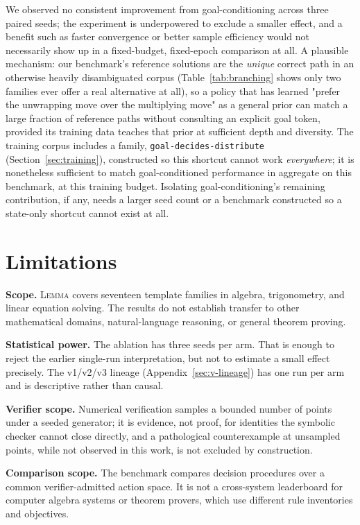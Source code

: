 \documentclass[11pt]{article}
\numberwithin{equation}{section}
\newcommand{\lemma}{\textsc{Lemma}}
\begin{document}
We observed no consistent improvement from goal-conditioning across three paired seeds; the experiment is underpowered to exclude a smaller effect, and a benefit such as faster convergence or better sample efficiency would not necessarily show up in a fixed-budget, fixed-epoch comparison at all. A plausible mechanism: our benchmark's reference solutions are the \emph{unique} correct path in an otherwise heavily disambiguated corpus (Table~\ref{tab:branching} shows only two families ever offer a real alternative at all), so a policy that has learned "prefer the unwrapping move over the multiplying move" as a general prior can match a large fraction of reference paths without consulting an explicit goal token, provided its training data teaches that prior at sufficient depth and diversity. The training corpus includes a family, \texttt{goal-decides-distribute} (Section~\ref{sec:training}), constructed so this shortcut cannot work \emph{everywhere}; it is nonetheless sufficient to match goal-conditioned performance in aggregate on this benchmark, at this training budget. Isolating goal-conditioning's remaining contribution, if any, needs a larger seed count or a benchmark constructed so a state-only shortcut cannot exist at all.

\section{Limitations}
\label{sec:limitations}

\textbf{Scope.} \lemma{} covers seventeen template families in algebra, trigonometry, and linear equation solving. The results do not establish transfer to other mathematical domains, natural-language reasoning, or general theorem proving.

\textbf{Statistical power.} The ablation has three seeds per arm. That is enough to reject the earlier single-run interpretation, but not to estimate a small effect precisely. The v1/v2/v3 lineage (Appendix~\ref{sec:v-lineage}) has one run per arm and is descriptive rather than causal.

\textbf{Verifier scope.} Numerical verification samples a bounded number of points under a seeded generator; it is evidence, not proof, for identities the symbolic checker cannot close directly, and a pathological counterexample at unsampled points, while not observed in this work, is not excluded by construction.

\textbf{Comparison scope.} The benchmark compares decision procedures over a common verifier-admitted action space. It is not a cross-system leaderboard for computer algebra systems or theorem provers, which use different rule inventories and objectives.
\end{document}
